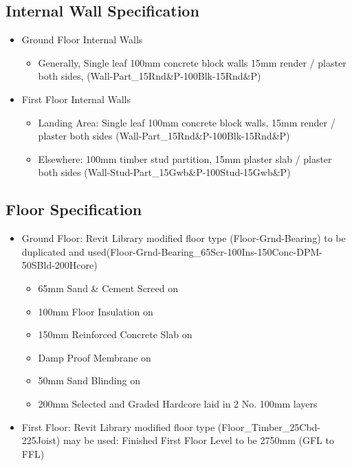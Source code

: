 \subsection*{Internal Wall Specification}

\begin{itemize}
	\item Ground Floor Internal Walls
		\begin{itemize}
			\item Generally, Single leaf 100mm concrete block walls 15mm render / plaster both sides, (Wall-Part\_15Rnd\&P-100Blk-15Rnd\&P)
		\end{itemize}
	\item First Floor Internal Walls
		\begin{itemize}
			\item Landing Area: Single leaf 100mm concrete block walls, 15mm render / plaster both sides (Wall-Part\_15Rnd\&P-100Blk-15Rnd\&P)
			\item Elsewhere: 100mm timber stud partition, 15mm plaster slab / plaster both sides (Wall-Stud-Part\_15Gwb\&P-100Stud-15Gwb\&P) 
		\end{itemize} 
\end{itemize}



\subsection*{Floor Specification}


\begin{itemize}
	\item Ground Floor: Revit Library modified floor type (Floor-Grnd-Bearing) to be duplicated and used(Floor-Grnd-Bearing\_65Scr-100Ins-150Conc-DPM-50SBld-200Hcore)
	\begin{itemize}
		\item 65mm Sand \& Cement Screed on
		\item 100mm Floor Insulation on
		\item 150mm Reinforced Concrete Slab on
		\item Damp Proof Membrane on
		\item 50mm Sand Blinding on 
		\item 200mm Selected and Graded Hardcore laid in 2 No. 100mm layers
	\end{itemize}
	\item First Floor: Revit Library modified floor type (Floor\_Timber\_25Cbd-225Joist) may be used: Finished First Floor Level to be 2750mm (GFL to FFL)

\end{itemize}












